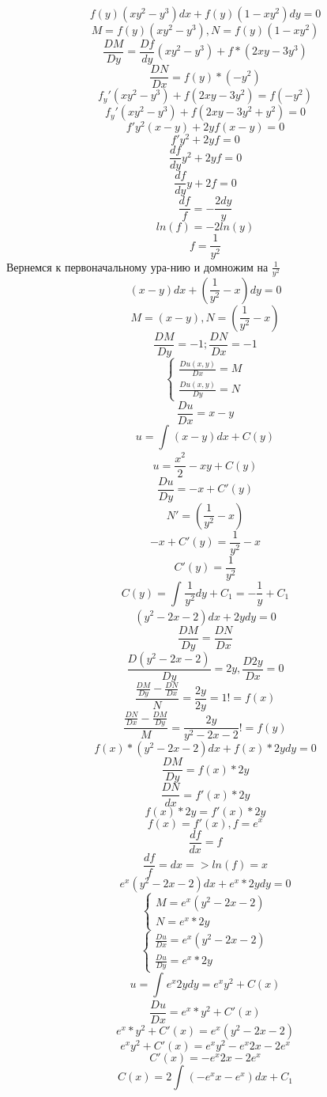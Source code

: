 \documentclass[a4paper,14pt]{extreport} %
\begin{document}
\[
  f(y)(xy^2-y^3)dx + f(y)(1-xy^2)dy = 0 
\]
\[
  M = f(y)(xy^2-y^3), N = f(y)(1-xy^2)
\]
\[
  \frac{DM}{Dy} = \frac{Df}{dy}(xy^2-y^3) + f*(2xy - 3y^3)
\]
\[
  \frac{DN}{Dx} = f(y)*(-y^2)
\]
\[
  f_y'(xy^2 - y^3) + f(2xy - 3y^2) = f(-y^2)
\]
\[
  f_y'(xy^2-y^3)+f(2xy-3y^2+y^2) = 0
\]
\[
  f'y^2(x-y)+2yf(x-y)=0
\]
\[
f'y^2 + 2yf = 0   
\]
\[
  \frac{df}{dy}y^2 + 2yf = 0
\]
\[
  \frac{df}{dy}y + 2f = 0 
\]
\[
  \frac{df}{f} = - \frac{2dy}{y}
\]
\[
  ln(f) = -2ln(y)
\]
\[
  f = \frac{1}{y^2}
\]
Вернемся к первоначальному ура-нию и домножим на $\frac{1}{y^2}$
\[
  (x-y)dx + (\frac{1}{y^2} - x)dy = 0
\]
\[
 M = (x-y), N = (\frac{1}{y^2} - x) 
\]
\[
  \frac{DM}{Dy} = -1; \frac{DN}{Dx} = -1
\]
\[
  \begin{cases}
    \frac{Du(x,y)}{Dx} = M \\ 
    \frac{Du(x,y)}{Dy} = N
  \end{cases}
\]
\[
  \frac{Du}{Dx} = x - y
\]
\[
  u = \int_{}^{}(x-y)dx + C(y)
\]
\[
  u = \frac{x^2}{2} - xy + C(y)
\]
\[
 \frac{Du}{Dy} = -x + C'(y) 
\]
\[
  N' = (\frac{1}{y^2} - x)
\]
\[
-x + C'(y) = \frac{1}{y^2} - x  
\]
\[
  C'(y) = \frac{1}{y^2}
\]
\[
  C(y) = \int_{}^{}\frac{1}{y^2}dy + C_1 = - \frac{1}{y} + C_1
\]
\[
  (y^2-2x-2)dx + 2ydy = 0
\]
\[
  \frac{DM}{Dy} = \frac{DN}{Dx}
\]
\[
  \frac{D(y^2-2x-2)}{Dy}  = 2y, \frac{D2y}{Dx} = 0
\]
\[
  \frac{\frac{DM}{Dy} - \frac{DN}{Dx}}{N} = \frac{2y}{2y} = 1 != f(x)
\]
\[
  \frac{\frac{DN}{Dx} - \frac{DM}{Dy}}{M} = \frac{2y}{y^2 - 2x - 2} != f(y)
\]
\[
  f(x)*(y^2 - 2x - 2)dx + f(x)*2ydy = 0
\]
\[
  \frac{DM}{Dy} = f(x)*2y
\]
\[
  \frac{DN}{dx} = f'(x)*2y
\]
\[
  f(x)*2y = f'(x)*2y
\]
\[
  f(x) = f'(x), f = e^x
\]
\[
  \frac{df}{dx} = f 
\]
\[
  \frac{df}{f} = dx => ln(f) = x
\]
\[
  e^x(y^2 - 2x - 2)dx + e^x*2ydy = 0
\]
\[
  \begin{cases}
    M = e^x(y^2 - 2x- 2)\\ 
    N = e^x*2y
  \end{cases}
\]
\[
  \begin{cases}
    
  \frac{Du}{Dx} =  e^x(y^2 -2x-2)\\ 
  \frac{Du}{Dy} = e^x*2y
\end{cases}
\]
\[
  u = \int_{}^{}e^x2ydy = e^xy^2+C(x)
\]
\[
  \frac{Du}{Dx} = e^x*y^2 + C'(x)
\]
\[
  e^x*y^2 + C'(x)= e^x(y^2 - 2x-2)
\]
\[
  e^xy^2 + C'(x) = e^xy^2 - e^x2x - 2e^x
\]
\[
  C'(x) = -e^x2x - 2e^x
\]
\[
  C(x) = 2 \int_{}^{}(-e^xx-e^x)dx + C_1
\]
\end{document}
